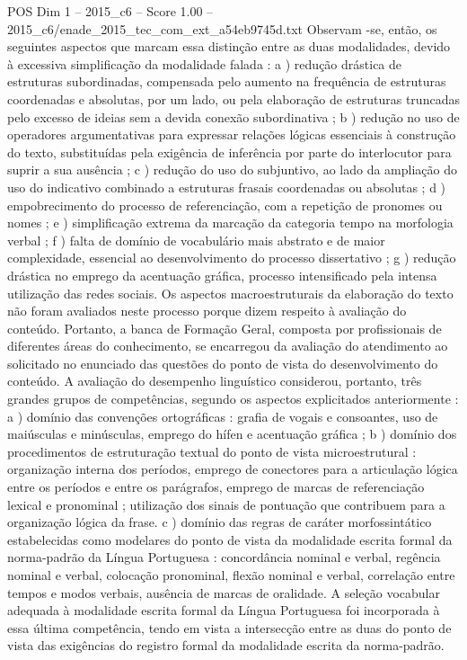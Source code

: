 \begin{textsample}{POS Dim 1 – 2015\_c6 – Score 1.00 – 2015\_c6/enade\_2015\_tec\_com\_ext\_a54eb9745d.txt}
Observam -se, então, os seguintes aspectos que marcam essa distinção entre as duas modalidades, devido à excessiva simplificação da modalidade falada : a ) redução drástica de estruturas subordinadas, compensada pelo aumento na frequência de estruturas coordenadas e absolutas, por um lado, ou pela elaboração de estruturas truncadas pelo excesso de ideias sem a devida conexão subordinativa ; b ) redução no uso de operadores argumentativas para expressar relações lógicas essenciais à construção do texto, substituídas pela exigência de inferência por parte do interlocutor para suprir a sua ausência ; c ) redução do uso do subjuntivo, ao lado da ampliação do uso do indicativo combinado a estruturas frasais coordenadas ou absolutas ; d ) empobrecimento do processo de referenciação, com a repetição de pronomes ou nomes ; e ) simplificação extrema da marcação da categoria tempo na morfologia verbal ; f ) falta de domínio de vocabulário mais abstrato e de maior complexidade, essencial ao desenvolvimento do processo dissertativo ; g ) redução drástica no emprego da acentuação gráfica, processo intensificado pela intensa utilização das redes sociais.
Os aspectos macroestruturais da elaboração do texto não foram avaliados neste processo porque dizem respeito à avaliação do conteúdo.
Portanto, a banca de Formação Geral, composta por profissionais de diferentes áreas do conhecimento, se encarregou da avaliação do atendimento ao solicitado no enunciado das questões do ponto de vista do desenvolvimento do conteúdo.
A avaliação do desempenho linguístico considerou, portanto, três grandes grupos de competências, segundo os aspectos explicitados anteriormente : a ) domínio das convenções ortográficas : grafia de vogais e consoantes, uso de maiúsculas e minúsculas, emprego do hífen e acentuação gráfica ; b ) domínio dos procedimentos de estruturação textual do ponto de vista microestrutural : organização interna dos períodos, emprego de conectores para a articulação lógica entre os períodos e entre os parágrafos, emprego de marcas de referenciação lexical e pronominal ; utilização dos sinais de pontuação que contribuem para a organização lógica da frase. c ) domínio das regras de caráter morfossintático estabelecidas como modelares do ponto de vista da modalidade escrita formal da norma-padrão da Língua Portuguesa : concordância nominal e verbal, regência nominal e verbal, colocação pronominal, flexão nominal e verbal, correlação entre tempos e modos verbais, ausência de marcas de oralidade.
A seleção vocabular adequada à modalidade escrita formal da Língua Portuguesa foi incorporada à essa última competência, tendo em vista a intersecção entre as duas do ponto de vista das exigências do registro formal da modalidade escrita da norma-padrão.

\end{textsample}
